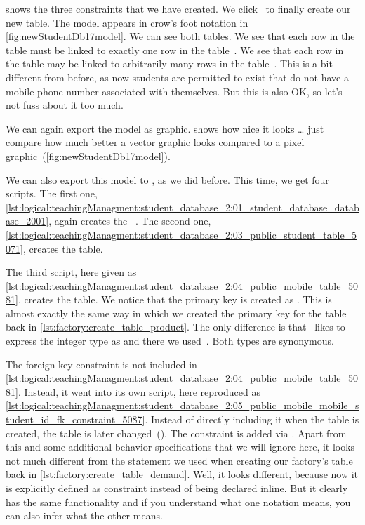  shows the three constraints that we have created.
We click~ to finally create our new table.
The model appears in crow's foot notation in \cref{fig:newStudentDb17model}.
We can see both tables.
We see that each row in the table  must be linked to exactly one row in the table~.
We see that each row in the table  may be linked to arbitrarily many rows in the table~.
This is a bit different from before, as now students are permitted to exist that do not have a mobile phone number associated with themselves.
But this is also OK, so let's not fuss about it too much.

We can again export the model as  graphic.
 shows how nice it looks {\dots} just compare how much better a vector graphic looks compared to a pixel graphic~(\cref{fig:newStudentDb17model}).

We can also export this model to \sql, as we did before.
This time, we get four scripts.
The first one, \cref{lst:logical:teachingManagment:student_database_2:01_student_database_database_2001}, again creates the ~\db.
The second one, \cref{lst:logical:teachingManagment:student_database_2:03_public_student_table_5071}, creates the  table.

The third script, here given as \cref{lst:logical:teachingManagment:student_database_2:04_public_mobile_table_5081}, creates the  table.
We notice that the primary key is created as .
This is almost exactly the same way in which we created the primary key for the  table back in \cref{lst:factory:create_table_product}.
The only difference is that \pgmodeler\ likes to express the integer type as  and there we used~.
Both types are synonymous.

The foreign key constraint is not included in \cref{lst:logical:teachingManagment:student_database_2:04_public_mobile_table_5081}.
Instead, it went into its own script, here reproduced as \cref{lst:logical:teachingManagment:student_database_2:05_public_mobile_mobile_student_id_fk_constraint_5087}.
Instead of directly including it when the table is created, the table is later changed~().
The constraint is added via .
Apart from this and some additional behavior specifications that we will ignore here, it looks not much different from the  statement we used when creating our factory's  table back in \cref{lst:factory:create_table_demand}.
Well, it looks different, because now it is explicitly defined as constraint instead of being declared inline.
But it clearly has the same functionality and if you understand what one notation means, you can also infer what the other means.

